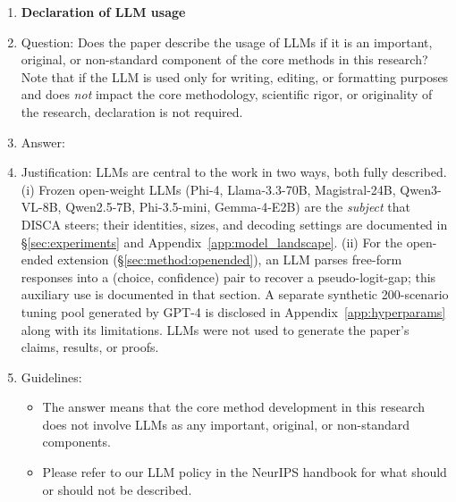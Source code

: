 \begin{enumerate}
\item {\bf Declaration of LLM usage}
    \item[] Question: Does the paper describe the usage of LLMs if it is an important, original, or non-standard component of the core methods in this research? Note that if the LLM is used only for writing, editing, or formatting purposes and does \emph{not} impact the core methodology, scientific rigor, or originality of the research, declaration is not required.
    \item[] Answer: \answerYes{}
    \item[] Justification: LLMs are central to the work in two ways, both fully described. (i) Frozen open-weight LLMs (Phi-4, Llama-3.3-70B, Magistral-24B, Qwen3-VL-8B, Qwen2.5-7B, Phi-3.5-mini, Gemma-4-E2B) are the \emph{subject} that DISCA steers; their identities, sizes, and decoding settings are documented in \S\ref{sec:experiments} and Appendix~\ref{app:model_landscape}. (ii) For the open-ended extension (\S\ref{sec:method:openended}), an LLM parses free-form responses into a (choice, confidence) pair to recover a pseudo-logit-gap; this auxiliary use is documented in that section. A separate synthetic 200-scenario tuning pool generated by GPT-4 is disclosed in Appendix~\ref{app:hyperparams} along with its limitations. LLMs were not used to generate the paper's claims, results, or proofs.
    \item[] Guidelines:
    \begin{itemize}
        \item The answer \answerNA{} means that the core method development in this research does not involve LLMs as any important, original, or non-standard components.
        \item Please refer to our LLM policy in the NeurIPS handbook for what should or should not be described.
    \end{itemize}

\end{enumerate}